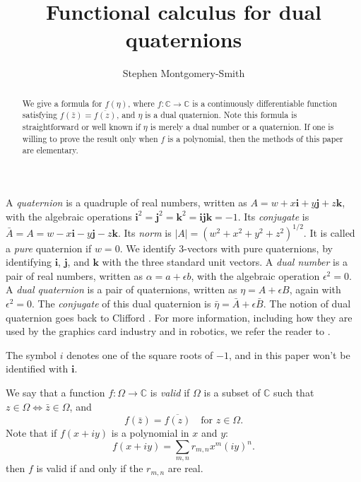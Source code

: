 \documentclass[12pt,reqno]{amsart}
\newcommand\bi{\bm i}
\newcommand\bj{\bm j}
\newcommand\bk{\bm k}
\begin{document}
\title{Functional calculus for dual quaternions}
\author{Stephen Montgomery-Smith}
\address{Department of Mathematics, University of Missouri, Columbia, MO 65211.}

\begin{abstract}  We give a formula for $f(\eta)$, where $f :\mathbb C \to \mathbb C$ is a continuously differentiable function satisfying
$f(\bar z) = \overline{f(z)}$,
and $\eta$ is a dual quaternion.  Note this formula is straightforward or well known if $\eta$ is merely a dual number or a quaternion.  If one is willing to prove the result only when $f$ is a polynomial, then the methods of this paper are elementary.
\end{abstract}

\maketitle

A \emph{quaternion} is a quadruple of real numbers, written as $A = w + x \bi + y \bj + z \bk$, with the algebraic operations $\bi^2 = \bj^2 = \bk^2 = \bi \bj \bk = -1$.  Its \emph{conjugate} is $\bar A = A = w - x \bi - y \bj - z \bk$.  Its \emph{norm} is $|A| = (w^2+x^2+y^2+z^2)^{1/2}$.  It is called a \emph{pure} quaternion if $w = 0$.  We identify 3-vectors with pure quaternions, by identifying $\bi$, $\bj$, and $\bk$ with the three standard unit vectors.  A \emph{dual number} is a pair of real numbers, written as $\alpha = a + \epsilon b$, with the algebraic operation $\epsilon^2 = 0$.  A \emph{dual quaternion} is a pair of quaternions, written as $\eta = A + \epsilon B$, again with $\epsilon^2 = 0$.  The \emph{conjugate} of this dual quaternion is $\bar \eta = \bar A + \epsilon \bar B$.  The notion of dual quaternion goes back to Clifford \cite{clifford}.  For more information, including how they are used by the graphics card industry and in robotics, we refer the reader to \cite{adorno,han-et-al,kavan-et-al,kavan-et-al-2,kenwright,wiki-2,yang-et-al}.

The symbol $i$ denotes one of the square roots of $-1$, and in this paper won't be identified with $\bi$.

We say that a function $f:\Omega \to \mathbb C$ is \emph{valid} if $\Omega$ is a subset of $\mathbb C$ such that $z\in\Omega \Leftrightarrow \bar z \in \Omega$, and
\begin{equation}
f(\bar z) = \overline{f(z)} \quad \text{for $z \in \Omega$.}
\end{equation}
Note that if $f(x+iy)$ is a polynomial in $x$ and $y$:
\begin{equation}
f(x+iy) = \sum_{m,n} r_{m,n} x^m (iy)^n.
\end{equation}
then $f$ is valid if and only if the $r_{m,n}$ are real.
\end{document}
